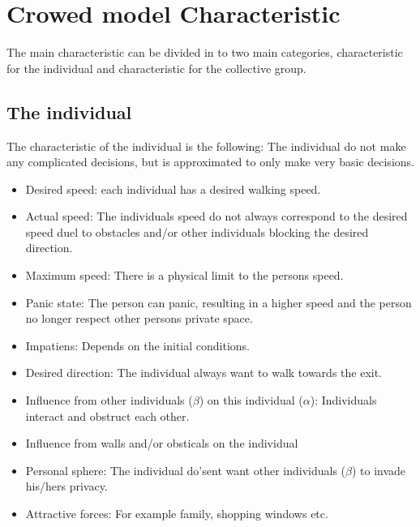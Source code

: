 \section{Crowed model Characteristic}
The main characteristic can be divided in to two main categories, characteristic for the individual and characteristic for the collective group.

\subsection{The individual}
The characteristic of the individual is the following: The individual do not make any complicated decisions, but is approximated to only make very basic decisions.
\begin{itemize}
\item Desired speed: each individual has a desired walking speed.\\
\item Actual speed: The individuals speed do not always correspond to the desired speed duel to obstacles and/or other individuals blocking the desired direction.\\
\item Maximum speed: There is a physical limit to the persons speed.\\
\item Panic state: The person can panic, resulting in a higher speed and the person no longer respect other persons private space.\\
\item Impatiens: Depends on the initial conditions.\\
\item Desired direction: The individual always want to walk towards the exit.\\
\item Influence from other individuals ($\beta$) on this individual ($\alpha$): Individuals interact and obstruct each other.\\
\item Influence from walls and/or obsticals on the individual\\
\item Personal sphere: The individual do'sent want other individuals ($\beta$) to invade his/hers privacy.\\
\item Attractive forces: For example family, shopping windows etc.\\

\end{itemize}


